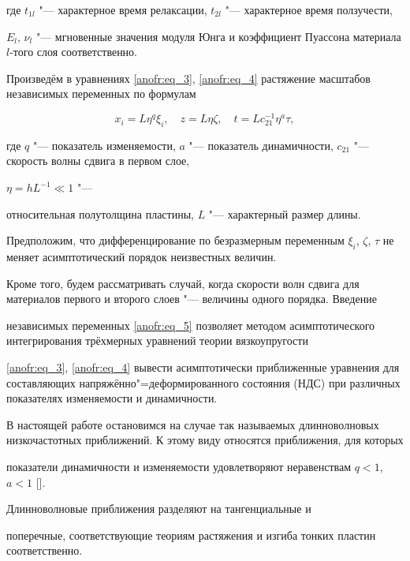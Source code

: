 где $t_{1l} $ "--- характерное время релаксации, $t_{2l} $ "--- характерное время ползучести,

$E_l$, $\nu _l$ "--- мгновенные значения модуля Юнга и коэффициент Пуассона материала $l$-того слоя соответственно.



Произведём в уравнениях \eqref{anofr:eq_3}, \eqref{anofr:eq_4} растяжение масштабов независимых переменных по формулам

\begin{equation}

\label{anofr:eq_5}

x_i =L\eta^q \xi_i,\quad z=L\eta \zeta, \quad t=Lc_{21}^{-1} \eta^a \tau,

\end{equation}

где $q$ "--- показатель изменяемости, $a$ "--- показатель динамичности, $c_{21} $ "--- скорость волны сдвига в первом слое,

$\eta =hL^{-1} \ll 1$ "---

относительная полутолщина пластины, $L$ "--- характерный размер длины.



Предположим, что дифференцирование по безразмерным переменным $\xi _i$, $\zeta$, $\tau$ не меняет асимптотический порядок неизвестных величин.

Кроме того, будем рассматривать случай, когда скорости волн сдвига для материалов первого и второго слоев "--- величины одного порядка. Введение

независимых переменных \eqref{anofr:eq_5} позволяет методом асимптотического интегрирования трёхмерных уравнений теории вязкоупругости

\eqref{anofr:eq_3}, \eqref{anofr:eq_4} вывести асимптотически приближенные уравнения для составляющих напряжённо"=деформированного состояния (НДС) при различных показателях изменяемости и динамичности.



В настоящей работе остановимся на случае так называемых длинноволновых низкочастотных приближений. К этому виду относятся приближения, для которых

показатели динамичности и изменяемости удовлетворяют неравенствам $q<1$, $a<1$ [].

Длинноволновые приближения разделяют на тангенциальные и

поперечные, соответствующие теориям растяжения и изгиба тонких пластин соответственно.




